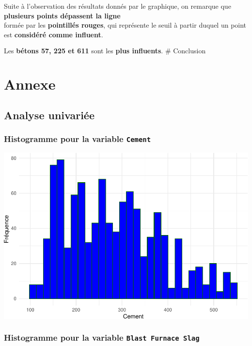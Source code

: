\documentclass[
  12pt,
]{article}
\begin{document}
Suite à l'observation des résultats donnés par le graphique, on remarque
que \textbf{plusieurs points dépassent la ligne}\\
formée par les \textbf{pointillés rouges}, qui représente le seuil à
partir duquel un point est \textbf{considéré comme influent}.

Les \textbf{bétons 57, 225 et 611} sont les \textbf{plus influents}. \#
Conclusion

\section{Annexe}\label{annexe}

\subsection{Analyse univariée}\label{analyse-univariuxe9e}

\subsubsection{\texorpdfstring{Histogramme pour la variable
\texttt{Cement}}{Histogramme pour la variable Cement}}\label{histogramme-pour-la-variable-cement}

\includegraphics{rmd_final_files/figure-latex/unnamed-chunk-40-1.pdf}

\subsubsection{\texorpdfstring{Histogramme pour la variable
\texttt{Blast\ Furnace\ Slag}}{Histogramme pour la variable Blast Furnace Slag}}\label{histogramme-pour-la-variable-blast-furnace-slag}
\end{document}
